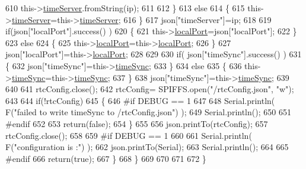 \begin{DoxyCode}
610                 this->\hyperlink{class_cool_time_ad2b9858f399108cb440dd1e908916f04}{timeServer}.fromString(ip);
611                 
612             \}
613             \textcolor{keywordflow}{else}
614             \{
615                 this->\hyperlink{class_cool_time_ad2b9858f399108cb440dd1e908916f04}{timeServer}=this->\hyperlink{class_cool_time_ad2b9858f399108cb440dd1e908916f04}{timeServer};
616             \}
617             json[\textcolor{stringliteral}{"timeServer"}]=ip;
618             
619             \textcolor{keywordflow}{if}(json[\textcolor{stringliteral}{"localPort"}].success() )
620             \{                       
621                 this->\hyperlink{class_cool_time_a2f777da44d7ba678be8185299e9b49d1}{localPort}=json[\textcolor{stringliteral}{"localPort"}];
622             \}
623             \textcolor{keywordflow}{else}
624             \{
625                 this->\hyperlink{class_cool_time_a2f777da44d7ba678be8185299e9b49d1}{localPort}=this->\hyperlink{class_cool_time_a2f777da44d7ba678be8185299e9b49d1}{localPort};
626             \}
627             json[\textcolor{stringliteral}{"localPort"}]=this->\hyperlink{class_cool_time_a2f777da44d7ba678be8185299e9b49d1}{localPort};
628 
629 
630             \textcolor{keywordflow}{if}( json[\textcolor{stringliteral}{"timeSync"}].success() )
631             \{
632                 json[\textcolor{stringliteral}{"timeSync"}]=this->\hyperlink{class_cool_time_a9d032e76c3470a15b3bbbc52af6463f7}{timeSync};
633             \}
634             \textcolor{keywordflow}{else}
635             \{
636                 this->\hyperlink{class_cool_time_a9d032e76c3470a15b3bbbc52af6463f7}{timeSync}=this->\hyperlink{class_cool_time_a9d032e76c3470a15b3bbbc52af6463f7}{timeSync};
637             \}
638             json[\textcolor{stringliteral}{"timeSync"}]=this->\hyperlink{class_cool_time_a9d032e76c3470a15b3bbbc52af6463f7}{timeSync};
639 
640 
641             rtcConfig.close();
642             rtcConfig= SPIFFS.open(\textcolor{stringliteral}{"/rtcConfig.json"}, \textcolor{stringliteral}{"w"});
643             
644             \textcolor{keywordflow}{if}(!rtcConfig)
645             \{
646 \textcolor{preprocessor}{            #if DEBUG == 1}
647 
648                 Serial.println( F(\textcolor{stringliteral}{"failed to write timeSync to /rtcConfig.json"}) );
649                 Serial.println();
650             
651 \textcolor{preprocessor}{            #endif}
652 
653                 \textcolor{keywordflow}{return}(\textcolor{keyword}{false});
654             \}
655             
656             json.printTo(rtcConfig);
657             rtcConfig.close();
658     
659 \textcolor{preprocessor}{        #if DEBUG == 1}
660 
661             Serial.println( F(\textcolor{stringliteral}{"configuration is :"}) );
662             json.printTo(Serial);
663             Serial.println();
664         
665 \textcolor{preprocessor}{        #endif}
666             \textcolor{keywordflow}{return}(\textcolor{keyword}{true}); 
667         \}
668     \}   
669 
670 
671 
672 \}
\end{DoxyCode}

